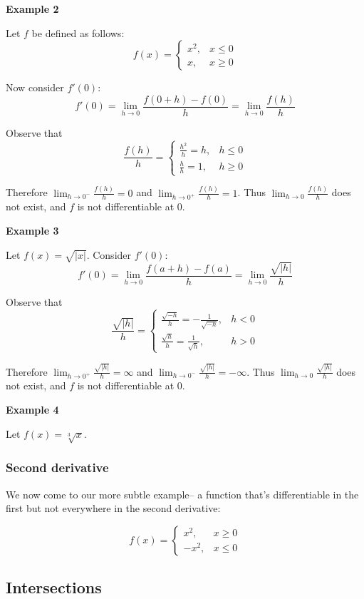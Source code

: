 \vs

\textbf{Example 2}

Let $f$ be defined as follows:
\[f(x)=\begin{cases}
  x^2,&x\leq 0\\
  x,&x\geq 0
\end{cases}\]

Now consider $f'(0)$:
\[f'(0)=\lim_{h\to0}\frac{f(0+h)-f(0)}{h}=\lim_{h\to0}\frac{f(h)}{h}\]

Observe that
\[\frac{f(h)}{h}=\begin{cases}
  \frac{h^2}{h}=h,&h\leq0\\
  \frac{h}{h}=1,&h\geq0
\end{cases}\]

Therefore $\lim_{h\to0^-}\frac{f(h)}{h}=0$ and
$\lim_{h\to0^+}\frac{f(h)}{h}=1$. Thus $\lim_{h\to0}\frac{f(h)}{h}$ does
not exist, and $f$ is not differentiable at $0$.

\vs

\textbf{Example 3}

Let $f(x)=\sqrt{|x|}$. Consider $f'(0)$:
\[f'(0)=\lim_{h\to0}\frac{f(a+h)-f(a)}{h}=\lim_{h\to0}\frac{\sqrt{|h|}}{h}\]

Observe that
\[\frac{\sqrt{|h|}}{h}=\begin{cases}
  \frac{\sqrt{-h}}{h}=-\frac{1}{\sqrt{-h}},&h<0\\
  \frac{\sqrt{h}}{h}=\frac{1}{\sqrt{h}},&h>0
\end{cases}\]

Therefore $\lim_{h\to0^+}\frac{\sqrt{|h|}}{h}=\infty$ and
$\lim_{h\to0^-}\frac{\sqrt{|h|}}{h}=-\infty$. Thus
$\lim_{h\to0}\frac{\sqrt{|h|}}{h}$ does not exist, and $f$ is not
differentiable at $0$.

\vs

\textbf{Example 4}

Let $f(x)=\sqrt[3]{x}$.


\subsubsection*{Second derivative}
We now come to our more subtle example-- a function that's
differentiable in the first but not everywhere in the second
derivative:

\[f(x)=\begin{cases}
  x^2,&x\geq0\\
  -x^2,&x\leq0
  \end{cases}\]

\subsection{Intersections}

